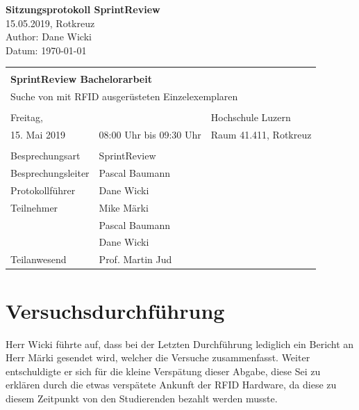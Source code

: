 \documentclass[parskip=full, a4paper]{scrreprt}
\begin{document}
\begin{titlepage}
\vspace*{2.5cm}
\noindent
\Huge{\textbf{Sitzungsprotokoll SprintReview}} \\
\noindent
\Large{15.05.2019, Rotkreuz}\\
\vfill
\noindent
\large{Author: Dane Wicki}\\
\noindent
\large{Datum: \today}\\
\end{titlepage}

\noindent
\begin{tabularx}{\textwidth}{XXl}
\hline \\
\multicolumn{3}{l}{\Large{\textbf{SprintReview  Bachelorarbeit}}}\\
\multicolumn{3}{l}{Suche von mit RFID ausgerüsteten Einzelexemplaren} \\ \\
\hline
	Freitag, & & Hochschule Luzern \\
	15. Mai 2019 & 08:00 Uhr bis 09:30 Uhr & Raum 41.411, Rotkreuz \\
\hline \\
\hline
Besprechungsart & SprintReview & \\
\hline
Besprechungsleiter & Pascal Baumann & \\
\hline
Protokollführer & Dane Wicki & \\
\hline
Teilnehmer & Mike Märki & \\ & Pascal Baumann & \\ & Dane Wicki & \\
\hline
Teilanwesend & Prof. Martin Jud & \\
\hline
\end{tabularx}

	\noindent

\tableofcontents
\clearpage
\chapter{Versuchsdurchführung}
Herr Wicki führte auf, dass bei der Letzten Durchführung lediglich ein Bericht an Herr Märki gesendet wird, welcher die Versuche zusammenfasst.
Weiter entschuldigte er sich für die kleine Verspätung dieser Abgabe, diese Sei zu erklären durch die etwas verspätete Ankunft der RFID Hardware, da diese zu diesem Zeitpunkt von den Studierenden bezahlt werden musste.
\end{document}
